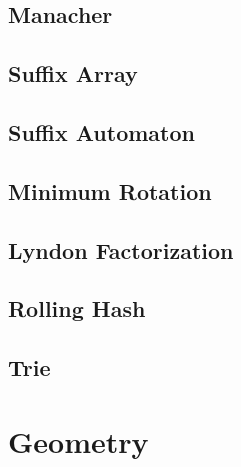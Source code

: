 \documentclass[a4paper,10pt,twocolumn,oneside,x11names]{article}
\begin{document}
\subsection{Manacher}


\subsection{Suffix Array}



\subsection{Suffix Automaton}


%

\subsection{Minimum Rotation}


\subsection{Lyndon Factorization}


\subsection{Rolling Hash}


\subsection{Trie}


% 

\section{Geometry}
\end{document}

